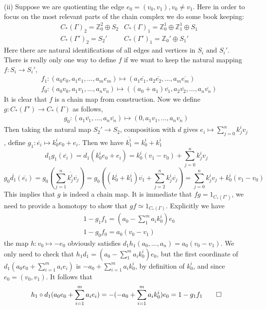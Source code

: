 \documentclass[11pt]{article}
\theoremstyle{definition}
\newcommand{\tand}{\text{ and }}
\begin{document}
    (ii) Suppose we are quotienting the edge \(e_0 = (v_0,v_1), v_0 \neq v_1\). Here in order to focus on the most relevant parts of the chain complex we do some book keeping:
    \begin{align*}
        &C_*(\Gamma)_2 = \mathbb{Z}_0^2 \oplus S_2 &C_*(\Gamma)_1 = \mathbb{Z}_0^1 \oplus \mathbb{Z}_1^1 \oplus S_1 \\
        &C_*(\Gamma')_2 = S_2' &C_*(\Gamma')_1 = \mathbb{Z}_0' \oplus S_1'
    \end{align*}
    Here there are natural identifications of all edges and vertices in \(S_i \tand S_i'\). There is really only one way to define \(f\) if we want to keep the natural mapping \(f: S_i \to S_i'\),
    \begin{align*}
        &f_1: (a_0e_0,a_1e_1,\hdots,a_me_m) \mapsto (a_1\overline{e_1},a_2\overline{e_2},\hdots,a_m\overline{e_m}) \\
        &f_0:(a_0v_0,a_1v_1,\hdots,a_nv_n) \mapsto ((a_0+a_1)\overline{v_1},a_2\overline{v_2},\hdots,a_n\overline{v_n})
    \end{align*}
    It is clear that \(f\) is a chain map from construction. Now we define \(g: C_*(\Gamma') \to C_*(\Gamma)\) as follows,
    \begin{align*}
        g_0: (a_1\overline{v_1},\hdots,a_n\overline{v_n}) \mapsto (0,a_1v_1,\hdots,a_nv_n)
    \end{align*}
    Then taking the natural map \(S_2' \to S_2\), composition with \(d\) gives \(e_i \mapsto \sum_{j=0}^nk_j^iv_j\), define \(g_1: \overline{e_i} \mapsto k^i_0e_0 + e_i\). Then we have \(\overline{k_1^i} = k_0^i + k_1^i\)
    \[d_1g_1(\overline{e_i}) = d_1(k_0^ie_0 + e_i) = k_0^i(v_1 - v_0) + \sum_{j=0}^n k_j^i v_j\]
    \[g_0\overline{d_1}(\overline{e_i}) = g_0\left(\sum_{j=1}^n \overline{k_j^i} \overline{v_j}\right) = g_0\left((k_0^i + k_1^i)\overline{v_1} + \sum_{j=2}^n k_j^i \overline{v_j}\right) = \sum_{j=0}^n k_j^i v_j + k_0^i(v_1 - v_0)\]
    This implies that \(g\) is indeed a chain map. It is immediate that \(fg = 1_{C_*(\Gamma')}\), we need to provide a homotopy to show that \(gf \simeq 1_{C_*(\Gamma)}\). Explicitly we have
    \begin{align*}
        &1 - g_1f_1 = \left(a_0 - \sum_1^m a_i k_0^i\right)e_0 \\
        &1 - g_0f_0 = a_0(v_0 - v_1)
    \end{align*}
    the map \(h: v_0 \mapsto -e_0\) obviously satisfies \(d_1h_1(a_0,\hdots,a_n) = a_0(v_0 - v_1)\). We only need to check that \(h_1d_1 = \left(a_0 - \sum_1^m a_i k_0^i\right)e_0\), but the first coordinate of \(d_1(a_0e_0 + \sum_{i=1}^m a_i e_i)\) is \(-a_0 + \sum_{i=1}^m a_ik_0^i\), by definition of \(k_0^i\), and since \(e_0 = (v_0,v_1)\). It follows that \[h_1\circ d_1(a_0e_0 + \sum_{i=1}^m a_i e_i) = -(-a_0 + \sum_{i=1}^m a_ik_0^i)e_0 = 1-g_1f_1 \qed\]
\end{document}
